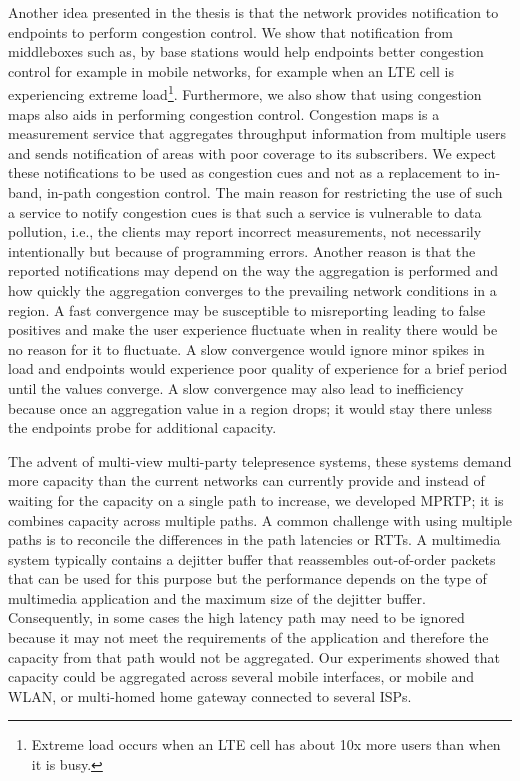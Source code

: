 Another idea presented in the thesis is that the network provides notification
to endpoints to perform congestion control. We show that notification from
middleboxes such as, by base stations would help endpoints better congestion
control for example in mobile networks, for example when an LTE cell is
experiencing extreme load\footnote{Extreme load occurs when an LTE cell has
about 10x more users than when it is busy.}. Furthermore, we also show that
using congestion maps also aids in performing congestion control. Congestion
maps is a measurement service that aggregates throughput information from
multiple users and sends notification of areas with poor coverage to its
subscribers. We expect these notifications to be used as congestion cues and
not as a replacement to in-band, in-path congestion control. The main reason
for restricting the use of such a service to notify congestion cues is that
such a service is vulnerable to data pollution, i.e., the clients may report
incorrect measurements, not necessarily intentionally but because of
programming errors. Another reason is that the reported notifications may
depend on the way the aggregation is performed and how quickly the aggregation
converges to the prevailing network conditions in a region. A fast convergence
may be susceptible to misreporting leading to false positives and make the
user experience fluctuate when in reality there would be no reason for it to
fluctuate. A slow convergence would ignore minor spikes in load and endpoints
would experience poor quality of experience for a brief period until the
values converge. A slow convergence may also lead to inefficiency because once
an aggregation value in a region drops; it would stay there unless the
endpoints probe for additional capacity.


The advent of multi-view multi-party telepresence systems, these systems
demand more capacity than the current networks can currently provide and
instead of waiting for the capacity on a single path to increase, we developed
MPRTP; it is combines capacity across multiple paths. A common challenge with
using multiple paths is to reconcile the differences in the path latencies or
RTTs. A multimedia system typically contains a dejitter buffer that
reassembles out-of-order packets that can be used for this purpose but the
performance depends on the type of multimedia application and the maximum size
of the dejitter buffer. Consequently, in some cases the high latency path may
need to be ignored because it may not meet the requirements of the application
and therefore the capacity from that path would not be aggregated. Our
experiments showed that capacity could be aggregated across several mobile
interfaces, or mobile and WLAN, or multi-homed home gateway connected to
several ISPs.



